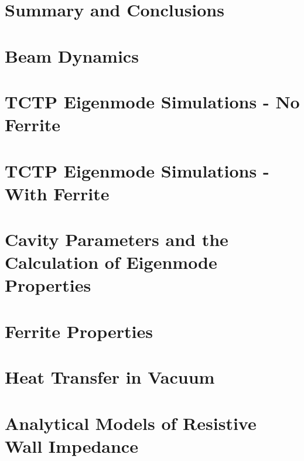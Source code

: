 \documentclass[12pt,PhD]{Thesis}
\begin{document}
\chapter{Summary and Conclusions}





\appendix{}
\chapter{Beam Dynamics}
\label{app:BeamDyn}



\chapter{TCTP Eigenmode Simulations - No Ferrite}
\label{app:tctp-eigenmodes}

\chapter{TCTP Eigenmode Simulations - With Ferrite}

\chapter{Cavity Parameters and the Calculation of Eigenmode Properties}

\chapter{Ferrite Properties}

\chapter{Heat Transfer in Vacuum}

\chapter{Analytical Models of Resistive Wall Impedance}

\end{document}
